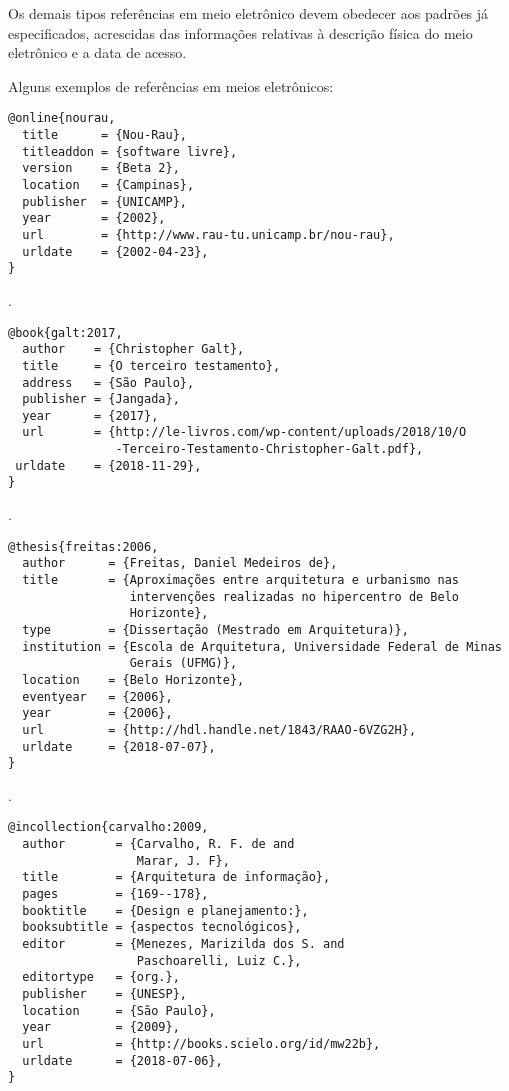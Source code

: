 Os demais tipos referências em meio eletrônico devem obedecer aos padrões já especificados, acrescidas das informações relativas à descrição física do meio eletrônico e a data de acesso.


Alguns exemplos de referências em meios eletrônicos:

\vspace*{1em}

\begin{verbatim}
@online{nourau,
  title      = {Nou-Rau},
  titleaddon = {software livre},
  version    = {Beta 2},
  location   = {Campinas},
  publisher  = {UNICAMP},
  year       = {2002},
  url        = {http://www.rau-tu.unicamp.br/nou-rau},
  urldate    = {2002-04-23},
}
\end{verbatim}

\noindent
{}.

\vspace*{1em}

\begin{verbatim}
@book{galt:2017,
  author    = {Christopher Galt},
  title     = {O terceiro testamento},
  address   = {São Paulo},
  publisher = {Jangada},
  year      = {2017},
  url       = {http://le-livros.com/wp-content/uploads/2018/10/O
               -Terceiro-Testamento-Christopher-Galt.pdf},
 urldate    = {2018-11-29},
}
\end{verbatim}

\noindent
{}.

\vspace*{1em}

\begin{verbatim}
@thesis{freitas:2006,
  author      = {Freitas, Daniel Medeiros de},
  title       = {Aproximações entre arquitetura e urbanismo nas
                 intervenções realizadas no hipercentro de Belo
                 Horizonte},
  type        = {Dissertação (Mestrado em Arquitetura)},
  institution = {Escola de Arquitetura, Universidade Federal de Minas
                 Gerais (UFMG)},
  location    = {Belo Horizonte},
  eventyear   = {2006},
  year        = {2006},
  url         = {http://hdl.handle.net/1843/RAAO-6VZG2H},
  urldate     = {2018-07-07},
}
\end{verbatim}

\noindent
{}.

\vspace*{1em}

\begin{verbatim}
@incollection{carvalho:2009,
  author       = {Carvalho, R. F. de and
                  Marar, J. F},
  title        = {Arquitetura de informação},
  pages        = {169--178},
  booktitle    = {Design e planejamento:},
  booksubtitle = {aspectos tecnológicos},
  editor       = {Menezes, Marizilda dos S. and
                  Paschoarelli, Luiz C.},
  editortype   = {org.},
  publisher    = {UNESP},
  location     = {São Paulo},
  year         = {2009},
  url          = {http://books.scielo.org/id/mw22b},
  urldate      = {2018-07-06},
}
\end{verbatim}

